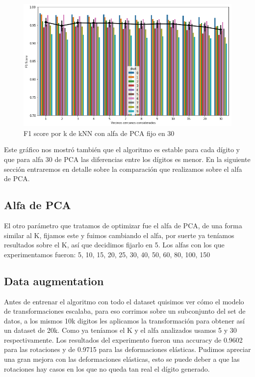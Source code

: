 \begin{figure}[H]
    \begin{center}
      \includegraphics[width=0.8\columnwidth]{imagenes/F1_alpha_30.png}
      \caption{F1 score por k de kNN con alfa de PCA fijo en 30}
    \end{center}
\end{figure}

Este gráfico nos mostró también que el algoritmo es estable para cada dígito y que para alfa 30 de PCA las diferencias entre los dígitos es menor. En la siguiente sección entraremos en detalle sobre la comparación que realizamos sobre el alfa de PCA.

\subsection{Alfa de PCA}

El otro parámetro que tratamos de optimizar fue el alfa de PCA, de una forma similar al K, fijamos este y fuimos cambiando el alfa, por suerte ya teníamos resultados sobre el K, así que decidimos fijarlo en 5. Los alfas con los que experimentamos fueron: 5, 10, 15, 20, 25, 30, 40, 50, 60, 80, 100, 150


\subsection{Data augmentation}

Antes de entrenar el algoritmo con todo el dataset quisimos ver cómo el modelo de transformaciones escalaba, para eso corrimos sobre un subconjunto del set de datos, a los mismos 10k digitos les aplicamos la transformación para obtener así un dataset de 20k. Como ya teníamos el K y el alfa analizados usamos 5 y 30 respectivamente. Los resultados del experimento fueron una accuracy de 0.9602 para las rotaciones y de 0.9715 para las deformaciones elásticas. Pudimos apreciar una gran mejora con las deformaciones elásticas, esto se puede deber a que las rotaciones hay casos en los que no queda tan real el dígito generado.